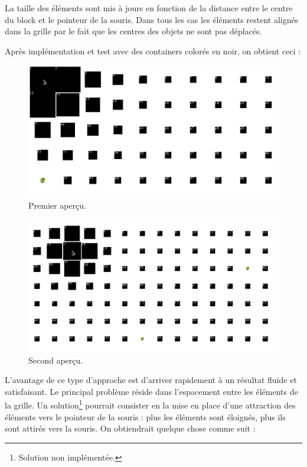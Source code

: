 La taille des éléments sont mis à jours en fonction de la distance entre le centre du block et le pointeur de la souris. Dans tous les cas les éléments restent alignés dans la grille par le fait que les centres des objets ne sont pas déplacés.

Après implémentation et test avec des containers colorés en noir, on obtient ceci :

\begin{figure}[H]
  \centering
  \includegraphics[width=\textwidth]{../resources/illustrations/c1}
  \caption{Premier aperçu.}
\end{figure}

\begin{figure}[H]
  \centering
  \includegraphics[width=\textwidth]{../resources/illustrations/c2}
  \caption{Second aperçu.}
\end{figure}

L'avantage de ce type d'approche est d'arriver rapidement à un résultat fluide et  satisfaisant. Le principal problème réside dans l'espacement entre les éléments de la grille. Un solution\footnote{Solution non implémentée.} pourrait consister en la mise en place d'une attraction des éléments vers le pointeur de la souris : plus les éléments sont éloignés, plus ils sont attirés vers la souris. On obtiendrait quelque chose comme suit :

